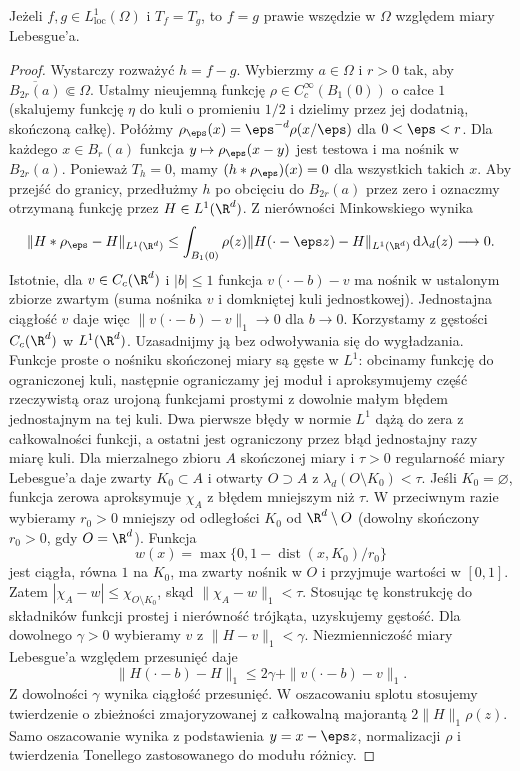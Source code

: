 \begin{stwierdzenie}
\label{prop:pde7-injective}
Jeżeli $f,g\in L^1_{\mathrm{loc}}(\Omega)$ i $T_f=T_g$, to $f=g$
prawie wszędzie w $\Omega$ względem miary Lebesgue'a.
\end{stwierdzenie}
\begin{proof}
Wystarczy rozważyć $h=f-g$. Wybierzmy $a\in\Omega$
i $r>0$ tak, aby $\overline{B_{2r}(a)}\Subset\Omega$.
Ustalmy nieujemną funkcję $\rho\in C_c^\infty(B_1(0))$
o całce $1$ (skalujemy funkcję $\eta$ do kuli
o promieniu $1/2$ i dzielimy przez jej dodatnią,
skończoną całkę). Połóżmy
$\rho_\eps(x)=\eps^{-d}\rho(x/\eps)$ dla $0<\eps<r$.
Dla każdego $x\in B_r(a)$ funkcja
$y\mapsto\rho_\eps(x-y)$ jest testowa i ma nośnik
w $B_{2r}(a)$. Ponieważ $T_h=0$, mamy
$(h*\rho_\eps)(x)=0$ dla wszystkich takich $x$.
Aby przejść do granicy, przedłużmy $h$ po obcięciu do
$B_{2r}(a)$ przez zero i oznaczmy otrzymaną funkcję
przez $H\in L^1(\R^d)$. Z nierówności Minkowskiego
wynika
\[
 \|H*\rho_\eps-H\|_{L^1(\R^d)}
 \le\int_{B_1(0)}\rho(z)
 \|H(\cdot-\eps z)-H\|_{L^1(\R^d)}
 \,\mathrm d\lambda_d(z)\longrightarrow0.
\]
Istotnie, dla $v\in C_c(\R^d)$ i $|b|\le1$
funkcja $v(\cdot-b)-v$ ma nośnik w ustalonym
zbiorze zwartym (suma nośnika $v$ i domkniętej
kuli jednostkowej). Jednostajna ciągłość $v$
daje więc $\|v(\cdot-b)-v\|_1\to0$ dla $b\to0$.
Korzystamy z gęstości $C_c(\R^d)$ w $L^1(\R^d)$.
Uzasadnijmy ją bez odwoływania się do wygładzania.
Funkcje proste o nośniku skończonej miary są gęste
w $L^1$: obcinamy funkcję do ograniczonej kuli,
następnie ograniczamy jej moduł i aproksymujemy
część rzeczywistą oraz urojoną funkcjami prostymi
z dowolnie małym błędem jednostajnym na tej kuli.
Dwa pierwsze błędy w normie $L^1$ dążą do zera
z całkowalności funkcji, a ostatni jest ograniczony
przez błąd jednostajny razy miarę kuli.
Dla mierzalnego zbioru $A$ skończonej miary
i $\tau>0$ regularność miary Lebesgue'a daje
zwarty $K_0\subset A$ i otwarty $O\supset A$
z $\lambda_d(O\setminus K_0)<\tau$.
Jeśli $K_0=\varnothing$, funkcja zerowa
aproksymuje $\chi_A$ z błędem mniejszym niż $\tau$.
W przeciwnym razie wybieramy $r_0>0$ mniejszy
od odległości $K_0$ od $\R^d\setminus O$
(dowolny skończony $r_0>0$, gdy $O=\R^d$).
Funkcja
\[
 w(x)=\max\{0,1-\operatorname{dist}(x,K_0)/r_0\}
\]
jest ciągła, równa $1$ na $K_0$, ma zwarty
nośnik w $O$ i przyjmuje wartości w $[0,1]$.
Zatem $|\chi_A-w|\le\chi_{O\setminus K_0}$,
skąd $\|\chi_A-w\|_1<\tau$.
Stosując tę konstrukcję do składników funkcji
prostej i nierówność trójkąta, uzyskujemy gęstość. Dla dowolnego $\gamma>0$
wybieramy $v$ z $\|H-v\|_1<\gamma$. Niezmienniczość
miary Lebesgue'a względem przesunięć daje
\[
 \|H(\cdot-b)-H\|_1
 \le2\gamma+\|v(\cdot-b)-v\|_1.
\]
Z dowolności $\gamma$ wynika ciągłość przesunięć.
W oszacowaniu splotu stosujemy twierdzenie
o zbieżności zmajoryzowanej z całkowalną
majorantą $2\|H\|_1\rho(z)$.
Samo oszacowanie wynika z podstawienia
$y=x-\eps z$, normalizacji $\rho$ i twierdzenia
Tonellego zastosowanego do modułu różnicy.


\end{proof}
